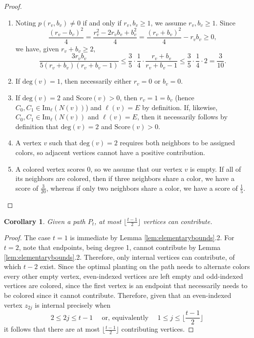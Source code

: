 \documentclass[11pt]{article}
\theoremstyle{plain}
\newtheorem{corollary}[theorem]{Corollary}
\begin{document}
\begin{proof}
\text{ }
    \begin{enumerate}
        \item Noting $p(r_v, b_v)\neq0$ if and only if $r_v, b_v \geq 1$, we assume $r_v, b_v \geq 1$. Since 
        \[\frac{(r_v - b_v)^2}{4} = \frac{r_v^2 -2r_v b_v + b_v^2}{4} = \frac{(r_v + b_v)^2}{4}-r_v b_v \geq 0,\]
        we have, given $r_v + b_v \geq 2$, 
        \[\frac{3 r_v b_v}{5 (r_v + b_v) (r_v + b_v -1)} \leq \frac{3}{5} \cdot \frac{1}{4} \cdot \frac{r_v + b_v}{r_v + b_v-1} \leq \frac{3}{5} \cdot \frac{1}{4} \cdot {2} = \frac{3}{10}.\]
        \item If $\mathrm{deg}(v) = 1$, then necessarily either $r_v=0$ or $b_v=0$.
        \item If $\mathrm{deg}(v) = 2$ and $\mathrm{Score}(v)>0$, then $r_v = 1 = b_v$ (hence $C_0, C_1 \in \mathrm{Im}_\ell (N(v))$) and $\ell(v) = E$ by definition. If, likewise, $C_0, C_1 \in \mathrm{Im}_\ell (N(v))$ and $\ell(v) = E$, then it necessarily follows by definition that $\mathrm{deg}(v) = 2$ and $\mathrm{Score}(v)>0$. 
        \item A vertex $v$ such that $\mathrm{deg}(v)=2$ requires both neighbors to be assigned colors, so adjacent vertices cannot have a positive contribution.
        \item A colored vertex scores $0$, so we assume that our vertex $v$ is empty. If all of its neighbors are colored, then if three neighbors share a color, we have a score of $\frac{3}{20}$, whereas if only two neighbors share a color, we have a score of $\frac{1}{5}$.
    \end{enumerate}
\end{proof}

\begin{corollary} \label{cor:armcontribute}
    Given a path $P_{t}$, at most $\lfloor \frac{t-1}{2} \rfloor$ vertices can contribute.
\end{corollary}
\begin{proof}
    The case $t=1$ is immediate by Lemma \ref{lem:elementarybounds}.2. For $t=2$, note that endpoints, being degree 1, cannot contribute by Lemma \ref{lem:elementarybounds}.2. Therefore, only internal vertices can contribute, of which $t-2$ exist. Since the optimal planting on the path needs to alternate colors every other empty vertex, even-indexed vertices are left empty and odd-indexed vertices are colored, since the first vertex is an endpoint that necessarily needs to be colored since it cannot contribute. Therefore, given that an even-indexed vertex $z_{2j}$ is internal precisely when
    \[2 \leq 2j \leq t-1 \quad \text{ or, equivalently } \quad 1 \leq j \leq \lfloor \frac{t-1}{2} \rfloor\]
    it follows that there are at most $\lfloor \frac{t-1}{2} \rfloor$ contributing vertices.
\end{proof}
\end{document}
